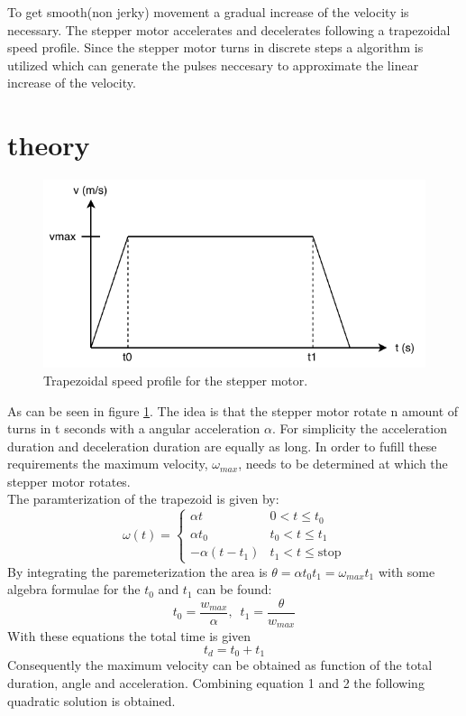 \documentclass{article}
\begin{document}
   To get smooth(non jerky) movement a gradual increase of the velocity is necessary. The stepper motor accelerates and decelerates following a trapezoidal speed profile. Since the stepper motor turns in discrete steps  a algorithm is utilized 
   which can generate the pulses neccesary to approximate the linear increase of the velocity.

   \section{theory}
   \begin{figure}[h]
        \includegraphics[width=\linewidth]{graph.pdf}
        \caption{Trapezoidal speed profile for the stepper motor.}
        \label{trapezoidal_plot}
   \end{figure}
   As can be seen in figure \ref{trapezoidal_plot}. The idea is that the stepper motor rotate n 
   amount of turns in t seconds with a angular acceleration $\alpha$. For simplicity the acceleration duration and
   deceleration duration are equally as long. In order to fufill these requirements the maximum velocity, $\omega_{max}$, 
   needs to be determined at which the stepper motor rotates. \\

   The paramterization of the trapezoid is given by:
    \[ \omega(t) = \begin{cases} 
          \alpha t & 0 < t \leq t_0 \\
          \alpha t_0 & t_0 < t \leq t_1 \\
          -\alpha(t-t_1) & t_1 < t \leq  \text{stop} 
       \end{cases}
    \]
    By integrating the paremeterization the area is $\theta =\alpha t_0 t_1 = \omega_{max}t_1$ with some algebra formulae for 
    the $t_0$ and $t_1$ can be found:
    \begin{equation}
       t_0 = \frac{w_{max}}{\alpha}, \, \, \, t_1 = \frac{\theta}{w_{max}}
    \end{equation}
    With these equations the total time is given 
    \begin{equation}
      t_{d} = t_0 + t_1
    \end{equation}
    Consequently the maximum velocity can be obtained as function of the total duration, angle and acceleration. Combining equation 1 and 2 
    the following quadratic solution is obtained. 
\end{document}
